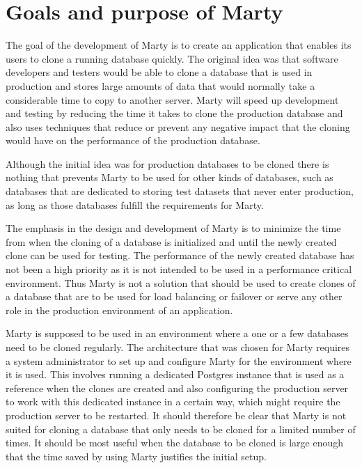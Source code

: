 \chapter{Goals and purpose of Marty}
The goal of the development of Marty is to create an application that enables its users to clone a running database quickly.
The original idea was that software developers and testers would be able to clone a database that is used in production and stores large amounts of data that would normally take a considerable time to copy to another server.
Marty will speed up development and testing by reducing the time it takes to clone the production database and also uses techniques that reduce or prevent any negative impact that the cloning would have on the performance of the production database. 

Although the initial idea was for production databases to be cloned there is nothing that prevents Marty to be used for other kinds of databases, such as databases that are dedicated to storing test datasets that never enter production, as long as those databases fulfill the requirements for Marty.

The emphasis in the design and development of Marty is to minimize the time from when the cloning of a database is initialized and until the newly created clone can be used for testing.
The performance of the newly created database has not been a high priority as it is not intended to be used in a performance critical environment.
Thus Marty is not a solution that should be used to create clones of a database that are to be used for load balancing or failover or serve any other role in the production environment of an application.

Marty is supposed to be used in an environment where a one or a few databases need to be cloned regularly.
The architecture that was chosen for Marty requires a system administrator to set up and configure Marty for the environment where it is used.
This involves running a dedicated Postgres instance that is used as a reference when the clones are created and also configuring the production server to work with this dedicated instance in a certain way, which might require the production server to be restarted.
It should therefore be clear that Marty is not suited for cloning a database that only needs to be cloned for a limited number of times.
It should be most useful when the database to be cloned is large enough that the time saved by using Marty justifies the initial setup.